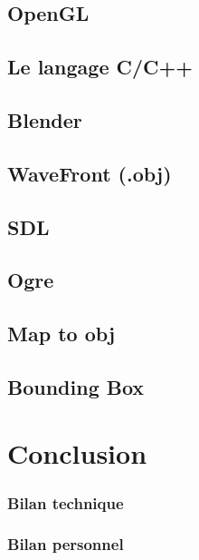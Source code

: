 \documentclass[a4paper,12pt]{report}
\begin{document}
\section*{OpenGL}
\section*{Le langage C/C++}
\section*{Blender}
\section*{WaveFront (.obj)}
\section*{SDL}
\section*{Ogre}
\section*{Map to obj}
\section*{Bounding Box}

\chapter{Conclusion}

\subsection*{Bilan technique}

\subsection*{Bilan personnel}
\end{document}
